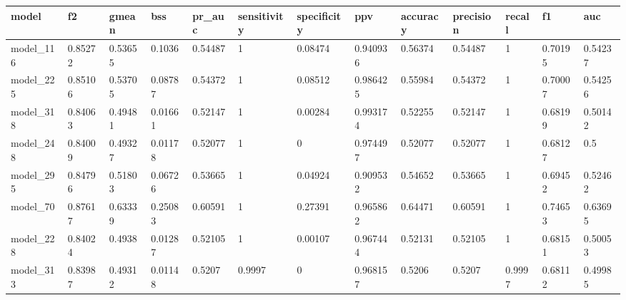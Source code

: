 \begin{tabular}{|l|l|l|l|l|l|l|l|l|l|l|l|l|}
\hline
\textbf{model} & \textbf{f2} & \textbf{gmean} & \textbf{bss} & \textbf{pr\_auc} & \textbf{sensitivity} & \textbf{specificity} & \textbf{ppv} & \textbf{accuracy} & \textbf{precision} & \textbf{recall} & \textbf{f1} & \textbf{auc} \\ \hline
model\_116     & 0.85272     & 0.53655        & 0.1036       & 0.54487          & 1                    & 0.08474              & 0.940936     & 0.56374           & 0.54487            & 1               & 0.70195     & 0.54237      \\ \hline
model\_225     & 0.85106     & 0.53705        & 0.08787      & 0.54372          & 1                    & 0.08512              & 0.986425     & 0.55984           & 0.54372            & 1               & 0.70007     & 0.54256      \\ \hline
model\_318     & 0.84063     & 0.49481        & 0.01661      & 0.52147          & 1                    & 0.00284              & 0.993174     & 0.52255           & 0.52147            & 1               & 0.68199     & 0.50142      \\ \hline
model\_248     & 0.84009     & 0.49327        & 0.01178      & 0.52077          & 1                    & 0                    & 0.974497     & 0.52077           & 0.52077            & 1               & 0.68127     & 0.5          \\ \hline
model\_295     & 0.84796     & 0.51803        & 0.06726      & 0.53665          & 1                    & 0.04924              & 0.909532     & 0.54652           & 0.53665            & 1               & 0.69452     & 0.52462      \\ \hline
model\_70      & 0.87617     & 0.63339        & 0.25083      & 0.60591          & 1                    & 0.27391              & 0.965862     & 0.64471           & 0.60591            & 1               & 0.74653     & 0.63695      \\ \hline
model\_228     & 0.84024     & 0.4938         & 0.01287      & 0.52105          & 1                    & 0.00107              & 0.967444     & 0.52131           & 0.52105            & 1               & 0.68151     & 0.50053      \\ \hline
model\_313     & 0.83987     & 0.49312        & 0.01148      & 0.5207           & 0.9997               & 0                    & 0.968157     & 0.5206            & 0.5207             & 0.9997          & 0.68112     & 0.49985      \\ \hline

\end{tabular}
